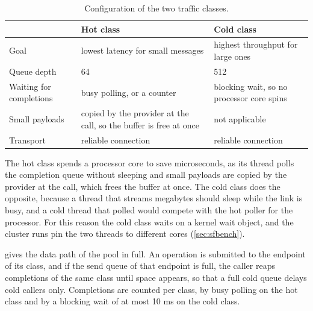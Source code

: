 \begin{table}[htbp]
  \centering
  \caption[Configuration of the two traffic classes]{Configuration of the two traffic classes.}
  \label{tab:classes}
  \small
  \begin{tabular}{L{3.6cm}L{5.2cm}L{5.2cm}}
    \toprule
    & Hot class & Cold class \\
    \midrule
    Goal & lowest latency for small messages & highest throughput for large ones \\
    Queue depth & 64 & 512 \\
    Waiting for completions & busy polling, or a counter & blocking wait, so no processor core spins \\
    Small payloads & copied by the provider at the call, so the buffer is free at once & not applicable \\
    Transport & reliable connection & reliable connection \\
    \bottomrule
  \end{tabular}
\end{table}

The hot class spends a processor core to save microseconds, as its thread
polls the completion queue without sleeping and small payloads are copied by
the provider at the call, which frees the buffer at once. The cold class does
the opposite, because a thread that streams megabytes should sleep while the
link is busy, and a cold thread that polled would compete with the hot poller
for the processor. For this reason the cold class waits on a kernel wait
object, and the cluster runs pin the two threads to different cores
(\cref{sec:sfbench}).

 gives the data path of the pool in full. An operation is
submitted to the endpoint of its class, and if the send queue of that
endpoint is full, the caller reaps completions of the same class until space
appears, so that a full cold queue delays cold callers only. Completions are
counted per class, by busy polling on the hot class and by a blocking wait of
at most 10 ms on the cold class.

